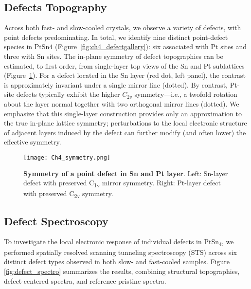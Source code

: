 \subsection{Defects Topography}
Across both fast- and slow-cooled crystals, we observe a variety of defects, with point defects predominating. In total, we identify nine distinct point-defect species in PtSn$4$ (Figure~\ref{fig:ch4_defectgallery}): six associated with Pt sites and three with Sn sites. The in-plane symmetry of defect topographies can be estimated, to first order, from single-layer top views of the Sn and Pt sublattices (Figure~\ref{fig:ch4_symmetry}). For a defect located in the Sn layer (red dot, left panel), the contrast is approximately invariant under a single mirror line (dotted). By contrast, Pt-site defects typically exhibit the higher $C_{2v}$ symmetry—i.e., a twofold rotation about the layer normal together with two orthogonal mirror lines (dotted). We emphasize that this single-layer construction provides only an approximation to the true in-plane lattice symmetry; perturbations to the local electronic structure of adjacent layers induced by the defect can further modify (and often lower) the effective symmetry.

\begin{figure}
	\centering
	\texttt{[image: Ch4\_symmetry.png]}
	\caption[\textbf{Symmetry of a point defect on Sn and Pt layer}]{\textbf{Symmetry of a point defect in Sn and Pt layer}. Left: Sn-layer defect with preserved C\textsubscript{1v} mirror symmetry. Right: Pt-layer defect with preserved C\textsubscript{2v} symmetry.}
	\label{fig:ch4_symmetry}
\end{figure}


\subsection{Defect Spectroscopy}\label{section:defect_spectro}
To investigate the local electronic response of individual defects in PtSn\textsubscript{4}, we performed spatially resolved scanning tunneling spectroscopy (STS) across six distinct defect types observed in both slow- and fast-cooled samples. Figure \ref{fig:defect_spectro} summarizes the results, combining structural topographies, defect-centered spectra, and reference pristine spectra.


